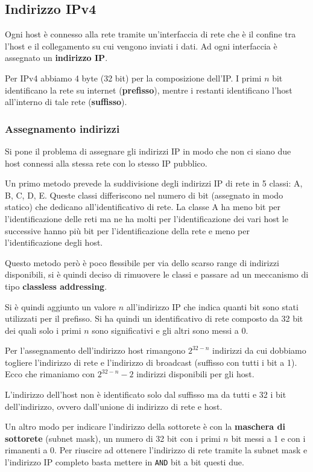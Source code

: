 \subsection{Indirizzo IPv4}
Ogni host è connesso alla rete tramite un'interfaccia di rete che è il confine tra l'host e il 
collegamento su cui vengono inviati i dati. Ad ogni interfaccia è assegnato un 
\textbf{indirizzo IP}.

Per IPv4 abbiamo 4 byte (32 bit) per la composizione dell'IP. I primi $n$ bit identificano la rete
su internet (\textbf{prefisso}), mentre i restanti identificano l'host all'interno di tale rete
(\textbf{suffisso}).

\subsubsection{Assegnamento indirizzi}
Si pone il problema di assegnare gli indirizzi IP in modo che non ci siano due host connessi alla
stessa rete con lo stesso IP pubblico.

Un primo metodo prevede la suddivisione degli indirizzi IP di rete in 5 classi: A, B, C, D, E.
Queste classi differiscono nel numero di bit (assegnato in modo statico) che dedicano 
all'identificativo di rete. La classe A ha meno bit per l'identificazione delle reti ma ne ha molti
per l'identificazione dei vari host le successive hanno più bit per l'identificazione della rete
e meno per l'identificazione degli host.

Questo metodo però è poco flessibile per via dello scarso range di indirizzi disponibili, si è
quindi deciso di rimuovere le classi e passare ad un meccanismo di tipo \textbf{classless 
addressing}.

Si è quindi aggiunto un valore $n$ all'indirizzo IP che indica quanti bit sono stati utilizzati 
per il prefisso. Si ha quindi un identificativo di rete composto da 32 bit dei quali solo i primi
$n$ sono significativi e gli altri sono messi a 0.

Per l'assegnamento dell'indirizzo host rimangono $2^{32-n}$ indirizzi da cui dobbiamo togliere 
l'indirizzo di rete e l'indirizzo di broadcast (suffisso con tutti i bit a 1). Ecco che rimaniamo
con $2^{32-n}-2$ indirizzi disponibili per gli host.

L'indirizzo dell'host non è identificato solo dal suffisso ma da tutti e 32 i bit dell'indirizzo,
ovvero dall'unione di indirizzo di rete e host.

Un altro modo per indicare l'indirizzo della sottorete è con la \textbf{maschera di sottorete}
(subnet mask), un numero di 32 bit con i primi $n$ bit messi a 1 e con i rimanenti a 0. Per 
riuscire ad ottenere l'indirizzo di rete tramite la subnet mask e l'indirizzo IP completo basta
mettere in \verb|AND| bit a bit questi due.

